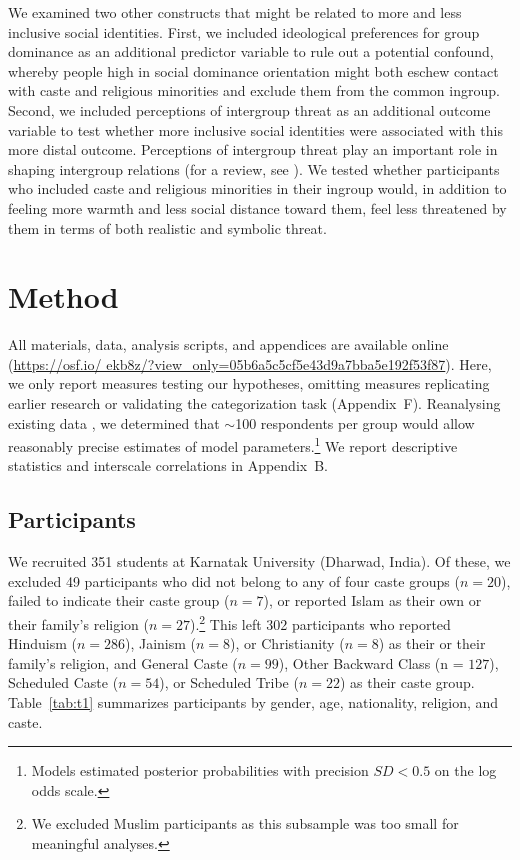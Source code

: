 \documentclass[12pt, a4paper]{article}
\begin{document}
We examined two other constructs that might be related to more and less inclusive social identities. First, we included ideological preferences for group dominance \cite{sidanius_social_1999} as an additional predictor variable to rule out a potential confound, whereby people high in social dominance orientation might both eschew contact with caste and religious minorities and exclude them from the common ingroup. Second, we included perceptions of intergroup threat as an additional outcome variable to test whether more inclusive social identities were associated with this more distal outcome. Perceptions of intergroup threat play an important role in shaping intergroup relations (for a review, see ). We tested whether participants who included caste and religious minorities in their ingroup would, in addition to feeling more warmth and less social distance toward them, feel less threatened by them in terms of both realistic and symbolic threat.

\section{Method}

All materials, data, analysis scripts, and appendices are available online (\href{https://osf.io/ekb8z/?view_only=05b6a5c5cf5e43d9a7bba5e192f53f87}{https://osf.io/ ekb8z/?view\_only=05b6a5c5cf5e43d9a7bba5e192f53f87}). Here, we only report measures testing our hypotheses, omitting measures replicating earlier research or validating the categorization task (Appendix~F). Reanalysing existing data \cite{dommelen_construing_2015}, we determined that $\sim$100 respondents per group would allow reasonably precise estimates of model parameters.\footnote{Models estimated posterior probabilities with precision $\textit{SD} < 0.5$ on the log odds scale.} We report descriptive statistics and interscale correlations in Appendix~B. 

\subsection{Participants}

We recruited 351 students at Karnatak University (Dharwad, India). Of these, we excluded 49 participants who did not belong to any of four caste groups ($n = 20$), failed to indicate their caste group ($n = 7$), or reported Islam as their own or their family's religion ($n = 27$).\footnote{We excluded Muslim participants as this subsample was too small for meaningful analyses.} This left 302 participants who reported Hinduism ($n = 286$), Jainism ($n = 8$), or Christianity ($n = 8$) as their or their family's religion, and General Caste ($n = 99$), Other Backward Class (n = $127$), Scheduled Caste ($n = 54$), or Scheduled Tribe ($n = 22$) as their caste group. Table~\ref{tab:t1} summarizes participants by gender, age, nationality, religion, and caste. 
\end{document}
